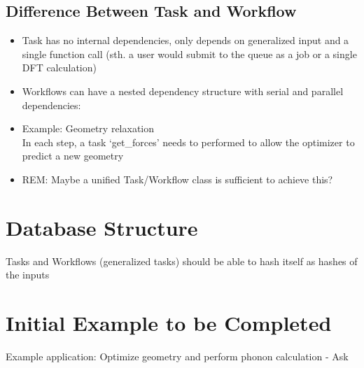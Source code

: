 \documentclass [notitlepage, 12pt, a4paper]{article}
\begin{document}
\subsection{Difference Between Task and Workflow}
\begin{itemize}
\item Task has no internal dependencies, only depends on generalized input and a single function call (sth. a user would submit to the queue as a job or a single DFT calculation)
\item Workflows can have a nested dependency structure with serial and parallel dependencies:
\item Example: Geometry relaxation\\
In each step, a task ‘get\_forces’ needs to performed to allow the optimizer to predict a new geometry
\item \textcolor{deepred}{REM: Maybe a unified Task/Workflow class is sufficient to achieve this?}
\end{itemize}

\section{Database Structure}
Tasks and Workflows (generalized tasks) should be able to hash itself as hashes of the inputs

\section{Initial Example to be Completed}
Example application: Optimize geometry and perform phonon calculation
- Ask
\end{document}
